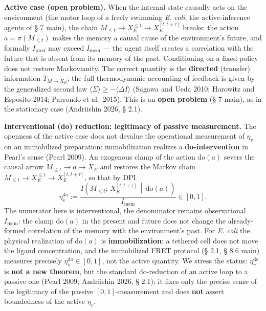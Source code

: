 \documentclass[pdflatex,sn-mathphys-ay]{sn-jnl}
\begin{document}
\textbf{Active case (open problem).} When the internal state causally acts on the environment (the motor loop of a freely swimming \emph{E. coli}, the active-inference agents of § 7 main), the chain \(M_{\le t} \to X_E^{\le t} \to X_E^{[t,t+\tau]}\) breaks: the action \(a = \pi(M_{\le t})\) makes the memory a causal cause of the environment's future, and formally \(I_{\text{pred}}\) may exceed \(I_{\text{mem}}\) --- the agent itself creates a correlation with the future that is absent from its memory of the past. Conditioning on a fixed policy does not restore Markovianity. The correct quantity is the \textbf{directed} (transfer) information \(T_{M \to X_E}\); the full thermodynamic accounting of feedback is given by the generalized second law \(\langle\Sigma\rangle \ge -\langle\Delta I\rangle\) (Sagawa and Ueda 2010; Horowitz and Esposito 2014; Parrondo et al.~2015). This is an \textbf{open problem} (§ 7 main), as in the stationary case (Andriishin 2026, § 2.1).



\textbf{Interventional (do) reduction: legitimacy of passive measurement.} The openness of the active case does not devalue the operational measurement of \(\eta_v\) on an immobilized preparation: immobilization realizes a \textbf{do-intervention} in Pearl's sense (Pearl 2009). An exogenous clamp of the action \(\mathrm{do}(a)\) severs the causal arrow \(M_{\le t} \to a \to X_E\) and restores the Markov chain \(M_{\le t} \to X_E^{\le t} \to X_E^{[t,t+\tau]}\), so that by DPI \[\eta_v^{\mathrm{do}} := \frac{I\!\left(M_{\le t};\, X_E^{[t,t+\tau]} \,\middle|\, \mathrm{do}(a)\right)}{I_{\text{mem}}} \in [0,1].\] The numerator here is interventional, the denominator remains observational \(I_{\text{mem}}\): the clamp \(\mathrm{do}(a)\) in the present and future does not change the already-formed correlation of the memory with the environment's past. For \emph{E. coli} the physical realization of \(\mathrm{do}(a)\) is \textbf{immobilization}: a tethered cell does not move the ligand concentration, and the immobilized FRET protocol (§ 2.1, § 8.6 main) measures precisely \(\eta_v^{\mathrm{do}} \in [0,1]\), not the active quantity. We stress the status: \(\eta_v^{\mathrm{do}}\) is \textbf{not a new theorem}, but the standard do-reduction of an active loop to a passive one (Pearl 2009; Andriishin 2026, § 2.1); it fixes only the precise sense of the legitimacy of the passive \([0,1]\)-measurement and does \textbf{not} assert boundedness of the active \(\eta_v\).
\end{document}

